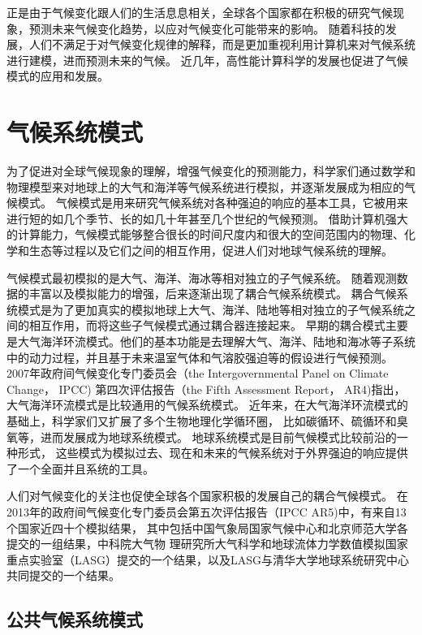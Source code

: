  
正是由于气候变化跟人们的生活息息相关，全球各个国家都在积极的研究气候现象，预测未来气候变化趋势，以应对气候变化可能带来的影响。 
随着科技的发展，人们不满足于对气候变化规律的解释，而是更加重视利用计算机来对气候系统进行建模，进而预测未来的气候。
近几年，高性能计算科学的发展也促进了气候模式的应用和发展。  



 
\section{气候系统模式}

为了促进对全球气候现象的理解，增强气候变化的预测能力，科学家们通过数学和物理模型来对地球上的大气和海洋等气候系统进行模拟，并逐渐发展成为相应的气候模式。
气候模式是用来研究气候系统对各种强迫的响应的基本工具，它被用来进行短的如几个季节、长的如几十年甚至几个世纪的气候预测。 
借助计算机强大的计算能力，气候模式能够整合很长的时间尺度内和很大的空间范围内的物理、化学和生态等过程以及它们之间的相互作用，促进人们对地球气候系统的理解\cite{hurrell2013community}。


气候模式最初模拟的是大气、海洋、海冰等相对独立的子气候系统。
随着观测数据的丰富以及模拟能力的增强，后来逐渐出现了耦合气候系统模式。
耦合气候系统模式是为了更加真实的模拟地球上大气、海洋、陆地等相对独立的子气候系统之间的相互作用，而将这些子气候模式通过耦合器连接起来\cite{hurrell2013community, liu2014c}。
早期的耦合模式主要是大气海洋环流模式。他们的基本功能是去理解大气、海洋、陆地和海冰等子系统中的动力过程，并且基于未来温室气体和气溶胶强迫等的假设进行气候预测。
2007年政府间气候变化专门委员会（the
Intergovernmental Panel on Climate Change， IPCC) 第四次评估报告（the Fifth Assessment
Report， AR4)指出，大气海洋环流模式是比较通用的气候系统模式\cite{solomon2007climate}。
近年来，在大气海洋环流模式的基础上，科学家们又扩展了多个生物地理化学循环圈， 比如碳循环、硫循环和臭氧等，进而发展成为地球系统模式。 地球系统模式是目前气候模式比较前沿的一种形式，
这些模式为模拟过去、现在和未来的气候系统对于外界强迫的响应提供了一个全面并且系统的工具。 

人们对气候变化的关注也促使全球各个国家积极的发展自己的耦合气候模式。
在2013年的政府间气候变化专门委员会第五次评估报告（IPCC AR5)中，有来自13个国家近四十个模拟结果，
其中包括中国气象局国家气候中心和北京师范大学各提交的一组结果，中科院大气物
理研究所大气科学和地球流体力学数值模拟国家重点实验室（LASG）提交的一个结果，以及LASG与清华大学地球系统研究中心共同提交的一个结果\cite{stocker2013ipcc}。


\subsection{公共气候系统模式}
 

